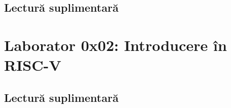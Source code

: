 \documentclass[a4paper,10pt]{article}
\begin{document}
\subsection{}

\subsection{Lectură suplimentară}

\section{Laborator 0x02: Introducere în RISC-V}
\subsection{}

\subsection{}

\subsection{}

\subsection{Lectură suplimentară}
\end{document}
